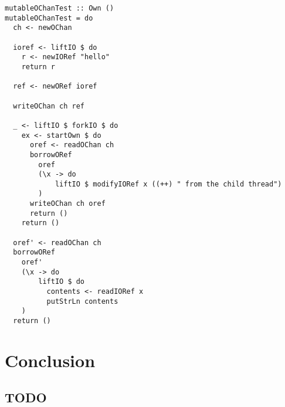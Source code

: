 \documentclass[onehalf,11pt]{beavtex}
\begin{document}
\begin{verbatim}
mutableOChanTest :: Own ()
mutableOChanTest = do
  ch <- newOChan

  ioref <- liftIO $ do
    r <- newIORef "hello"
    return r

  ref <- newORef ioref

  writeOChan ch ref

  _ <- liftIO $ forkIO $ do
    ex <- startOwn $ do
      oref <- readOChan ch
      borrowORef
        oref
        (\x -> do
            liftIO $ modifyIORef x ((++) " from the child thread")
        )
      writeOChan ch oref
      return ()
    return ()

  oref' <- readOChan ch
  borrowORef
    oref'
    (\x -> do
        liftIO $ do
          contents <- readIORef x
          putStrLn contents
    )
  return ()
\end{verbatim}









\chapter{Conclusion}
\section{TODO}


{}

\end{document}
